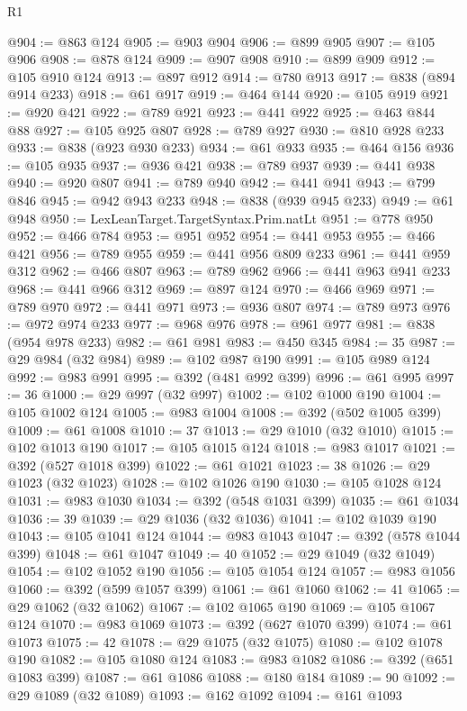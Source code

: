 \begin{lexlean}{R1}
\begin{coremodule}
{{{{{{{{{{{{{{{{{{{{{{{{{{{{{{{{{{{{{{{{{{{{{{{{{{{{{{{{{{{{{{{{{{{{{{{{{{{{{{{{{{{{{{{{{{@904 := @863 @124
@905 := @903 @904
@906 := @899 @905
@907 := @105 @906
@908 := @878 @124
@909 := @907 @908
@910 := @899 @909
@912 := @105 @910 @124
@913 := @897 @912
@914 := @780 @913
@917 := @838 (@894 @914 @233)
@918 := @61 @917
@919 := @464 @144
@920 := @105 @919
@921 := @920 @421
@922 := @789 @921
@923 := @441 @922
@925 := @463 @844 @88
@927 := @105 @925 @807
@928 := @789 @927
@930 := @810 @928 @233
@933 := @838 (@923 @930 @233)
@934 := @61 @933
@935 := @464 @156
@936 := @105 @935
@937 := @936 @421
@938 := @789 @937
@939 := @441 @938
@940 := @920 @807
@941 := @789 @940
@942 := @441 @941
@943 := @799 @846
@945 := @942 @943 @233
@948 := @838 (@939 @945 @233)
@949 := @61 @948
@950 := LexLeanTarget.TargetSyntax.Prim.natLt
@951 := @778 @950
@952 := @466 @784
@953 := @951 @952
@954 := @441 @953
@955 := @466 @421
@956 := @789 @955
@959 := @441 @956 @809 @233
@961 := @441 @959 @312
@962 := @466 @807
@963 := @789 @962
@966 := @441 @963 @941 @233
@968 := @441 @966 @312
@969 := @897 @124
@970 := @466 @969
@971 := @789 @970
@972 := @441 @971
@973 := @936 @807
@974 := @789 @973
@976 := @972 @974 @233
@977 := @968 @976
@978 := @961 @977
@981 := @838 (@954 @978 @233)
@982 := @61 @981
@983 := @450 @345
@984 := 35
@987 := @29 @984 (@32 @984)
@989 := @102 @987 @190
@991 := @105 @989 @124
@992 := @983 @991
@995 := @392 (@481 @992 @399)
@996 := @61 @995
@997 := 36
@1000 := @29 @997 (@32 @997)
@1002 := @102 @1000 @190
@1004 := @105 @1002 @124
@1005 := @983 @1004
@1008 := @392 (@502 @1005 @399)
@1009 := @61 @1008
@1010 := 37
@1013 := @29 @1010 (@32 @1010)
@1015 := @102 @1013 @190
@1017 := @105 @1015 @124
@1018 := @983 @1017
@1021 := @392 (@527 @1018 @399)
@1022 := @61 @1021
@1023 := 38
@1026 := @29 @1023 (@32 @1023)
@1028 := @102 @1026 @190
@1030 := @105 @1028 @124
@1031 := @983 @1030
@1034 := @392 (@548 @1031 @399)
@1035 := @61 @1034
@1036 := 39
@1039 := @29 @1036 (@32 @1036)
@1041 := @102 @1039 @190
@1043 := @105 @1041 @124
@1044 := @983 @1043
@1047 := @392 (@578 @1044 @399)
@1048 := @61 @1047
@1049 := 40
@1052 := @29 @1049 (@32 @1049)
@1054 := @102 @1052 @190
@1056 := @105 @1054 @124
@1057 := @983 @1056
@1060 := @392 (@599 @1057 @399)
@1061 := @61 @1060
@1062 := 41
@1065 := @29 @1062 (@32 @1062)
@1067 := @102 @1065 @190
@1069 := @105 @1067 @124
@1070 := @983 @1069
@1073 := @392 (@627 @1070 @399)
@1074 := @61 @1073
@1075 := 42
@1078 := @29 @1075 (@32 @1075)
@1080 := @102 @1078 @190
@1082 := @105 @1080 @124
@1083 := @983 @1082
@1086 := @392 (@651 @1083 @399)
@1087 := @61 @1086
@1088 := @180 @184
@1089 := 90
@1092 := @29 @1089 (@32 @1089)
@1093 := @162 @1092
@1094 := @161 @1093
}}}}}}}}}}}}}}}}}}}}}}}}}}}}}}}}}}}}}}}}}}}}}}}}}}}}}}}}}}}}}}}}}}}}}}}}}}}}}}}}}}}}}}}}}}
\end{coremodule}
\end{lexlean}
